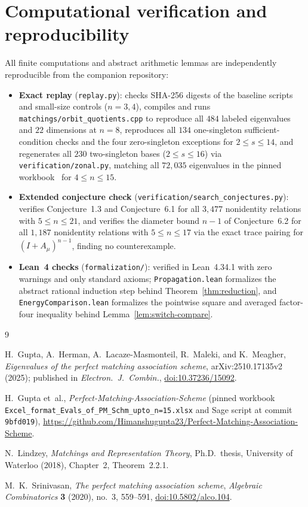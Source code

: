 \documentclass[11pt]{article}
\theoremstyle{remark}
\begin{document}
\section{Computational verification and reproducibility}\label{sec:repro}

All finite computations and abstract arithmetic lemmas are independently
reproducible from the companion repository:
\begin{itemize}
  \item \textbf{Exact replay} (\texttt{replay.py}): checks SHA-256 digests of
  the baseline scripts and small-size controls ($n = 3, 4$), compiles and runs
  \texttt{matchings/orbit\_quotients.cpp} to reproduce all $484$ labeled
  eigenvalues and $22$ dimensions at $n = 8$, reproduces all $134$
  one-singleton sufficient-condition checks and the four zero-singleton
  exceptions for $2 \le s \le 14$, and regenerates all $230$ two-singleton
  bases ($2 \le s \le 16$) via \texttt{verification/zonal.py}, matching all
  $72{,}035$ eigenvalues in the pinned workbook~\cite{GuptaRepo} for
  $4 \le n \le 15$.
  \item \textbf{Extended conjecture check} (\texttt{verification/search\_conjectures.py}):
  verifies Conjecture~1.3 and Conjecture~6.1 for all $3{,}477$ nonidentity
  relations with $5 \le n \le 21$, and verifies the diameter bound $n - 1$ of
  Conjecture~6.2 for all $1{,}187$ nonidentity relations with $5 \le n \le 17$
  via the exact trace pairing for $(I + A_\mu)^{n-1}$, finding no
  counterexample.
  \item \textbf{Lean~4 checks} (\texttt{formalization/}): verified in
  Lean~4.34.1 with zero warnings and only standard axioms;
  \texttt{Propagation.lean} formalizes the abstract rational induction step
  behind Theorem~\ref{thm:reduction}, and \texttt{EnergyComparison.lean}
  formalizes the pointwise square and averaged factor-four inequality behind
  Lemma~\ref{lem:switch-compare}.
\end{itemize}

\begin{thebibliography}{9}

H.~Gupta, A.~Herman, A.~Lacaze-Masmonteil, R.~Maleki, and K.~Meagher,
\emph{Eigenvalues of the perfect matching association scheme},
arXiv:2510.17135v2 (2025); published in \emph{Electron.\ J.\ Combin.},
\href{https://doi.org/10.37236/15092}{doi:10.37236/15092}.

H.~Gupta et~al.,
\emph{Perfect-Matching-Association-Scheme} (pinned workbook
\nolinkurl{Excel_format_Evals_of_PM_Schm_upto_n=15.xlsx} and Sage script at
commit \texttt{9bfd019}),
\url{https://github.com/Himanshugupta23/Perfect-Matching-Association-Scheme}.

N.~Lindzey,
\emph{Matchings and Representation Theory},
Ph.D.\ thesis, University of Waterloo (2018), Chapter~2, Theorem~2.2.1.

M.~K.~Srinivasan,
\emph{The perfect matching association scheme},
\emph{Algebraic Combinatorics} \textbf{3} (2020), no.~3, 559--591,
\href{https://doi.org/10.5802/alco.104}{doi:10.5802/alco.104}.

\end{thebibliography}
\end{document}
